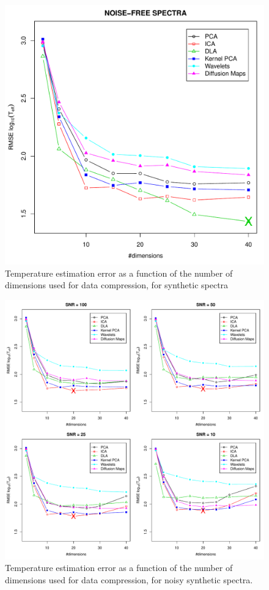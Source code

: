 \documentclass[a4paper,fleqn,usenatbib]{mnras}
\begin{document}
\begin{figure}
\centering\includegraphics[width=\columnwidth]{flamesHR10_SNR=000_Teff_log_BestSVM_N-RMSE_test.pdf}
\caption{Temperature estimation error as a function of the number of
  dimensions used for data compression, for synthetic spectra}
\label{fig:01}
\end{figure}

\begin{figure}
\centering\includegraphics[width=\textwidth]{flamesHR10_Teff_log_BestSVM_N-RMSE_test.pdf}
\caption{Temperature estimation error as a function of the number of
  dimensions used for data compression, for noisy synthetic
  spectra.}
\label{fig:02}
\end{figure}
\end{document}
